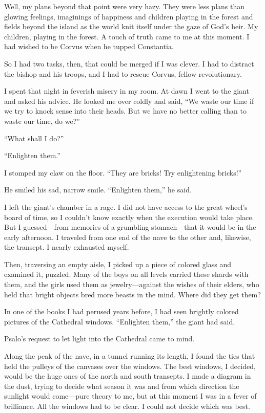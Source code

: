 Well, my plans beyond that point were very hazy. They were less plans than glowing feelings, imaginings of happiness and children playing in the forest and fields beyond the island as the world knit itself under the gaze of God’s heir. My children, playing in the forest. A touch of truth came to me at this moment. I had wished to be Corvus when he tupped Constantia.

So I had two tasks, then, that could be merged if I was clever. I had to distract the bishop and his troops, and I had to rescue Corvus, fellow revolutionary.

I spent that night in feverish misery in my room. At dawn I went to the giant and asked his advice. He looked me over coldly and said, “We waste our time if we try to knock sense into their heads. But we have no better calling than to waste our time, do we?”

“What shall I do?”

“Enlighten them.”

I stomped my claw on the floor. “They are bricks! Try enlightening bricks!”

He smiled his sad, narrow smile. “Enlighten them,” he said.

I left the giant’s chamber in a rage. I did not have access to the great wheel’s board of time, so I couldn’t know exactly when the execution would take place. But I guessed—from memories of a grumbling stomach—that it would be in the early afternoon. I traveled from one end of the nave to the other and, likewise, the transept. I nearly exhausted myself.

Then, traversing an empty aisle, I picked up a piece of colored glass and examined it, puzzled. Many of the boys on all levels carried these shards with them, and the girls used them as jewelry—against the wishes of their elders, who held that bright objects bred more beasts in the mind. Where did they get them?

In one of the books I had perused years before, I had seen brightly colored pictures of the Cathedral windows. “Enlighten them,” the giant had said.

Psalo’s request to let light into the Cathedral came to mind.

Along the peak of the nave, in a tunnel running its length, I found the ties that held the pulleys of the canvases over the windows. The best windows, I decided, would be the huge ones of the north and south transepts. I made a diagram in the dust, trying to decide what season it was and from which direction the sunlight would come—pure theory to me, but at this moment I was in a fever of brilliance. All the windows had to be clear. I could not decide which was best.

